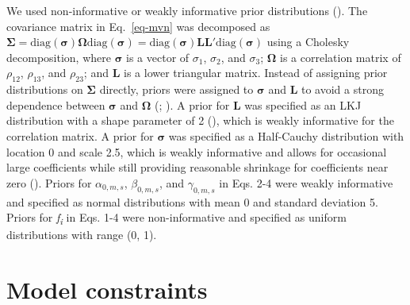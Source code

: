 \documentclass[
  12pt,
  letterpaper,
  DIV=11,
  numbers=noendperiod]{scrartcl}
\numberwithin{equation}{section}
\begin{document}
We used non-informative or weakly informative prior distributions
(). The covariance matrix in
Eq.~\ref{eq-mvn} was decomposed as
\({\boldsymbol \Sigma} = \mathrm {diag}(\boldsymbol {\sigma}){\boldsymbol \Omega}\mathrm {diag}({\boldsymbol \sigma}) = \mathrm {diag}({\boldsymbol \sigma}){\boldsymbol L}{\boldsymbol L}\prime \mathrm {diag}({\boldsymbol \sigma})\)
using a Cholesky decomposition, where \(\boldsymbol {\sigma}\) is a
vector of \(\sigma_{1}\), \(\sigma_{2}\), and \(\sigma_{3}\);
\({\boldsymbol \Omega}\) is a correlation matrix of \(\rho_{12}\),
\(\rho_{13}\), and \(\rho_{23}\); and \textbf{L} is a lower triangular
matrix. Instead of assigning prior distributions on
\(\boldsymbol{\Sigma}\) directly, priors were assigned to
\({\boldsymbol \sigma}\) and \textbf{L} to avoid a strong dependence
between \({\boldsymbol \sigma}\) and \({\boldsymbol \Omega}\)
(;
). A prior for
\textbf{L} was specified as an LKJ distribution with a shape parameter
of 2 (), which
is weakly informative for the correlation matrix. A prior for
\(\boldsymbol{\sigma}\) was specified as a Half-Cauchy distribution with
location 0 and scale 2.5, which is weakly informative and allows for
occasional large coefficients while still providing reasonable shrinkage
for coefficients near zero (). Priors for \(\alpha_{0,m,s}\), \(\beta_{0,m,s}\), and
\(\gamma_{0,m,s}\) in Eqs. 2-4 were weakly informative and specified as
normal distributions with mean 0 and standard deviation 5. Priors for
\emph{f\textsubscript{i}} in Eqs. 1-4 were non-informative and specified
as uniform distributions with range (0, 1).

\newpage

\section{Model constraints}\label{model-constraints}
\end{document}
